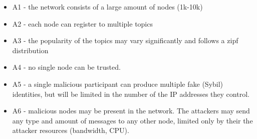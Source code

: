 \begin{itemize}
    \item A1 - the network consists of a large amount of nodes (1k-10k)
    \item A2 - each node can register to multiple topics
    \item A3 - the popularity of the topics may vary significantly and follows a zipf distribution
    \item A4 - no single node can be trusted.
    \item A5 - a single malicious participant can produce multiple fake (Sybil) identities, but will be limited in the number of the IP addresses they control.
    \item A6 - malicious nodes may be present in the network. The attackers may send any type and amount of messages to any other node, limited only by their the attacker resources (bandwidth, CPU).
\end{itemize}